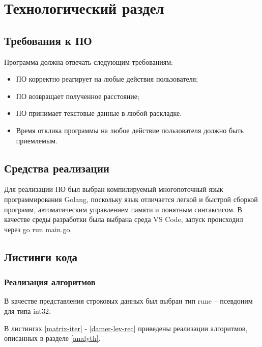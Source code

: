 \chapter{Технологический раздел}

\section{Требования к ПО}
Программа должна отвечать следующим требованиям:
\begin{itemize}
	\item ПО корректно реагирует на любые действия пользователя;
	\item ПО возвращает полученное расстояние;
	\item ПО принимает текстовые данные в любой раскладке.
	\item Время отклика программы на любое действие пользователя должно быть приемлемым.
\end{itemize}
\section{Средства реализации}
Для реализации ПО был выбран компилируемый многопоточный язык программирования Golang, поскольку язык отличается легкой и быстрой сборкой программ, автоматическим управлением памяти и понятным синтаксисом.
В качестве среды разработки была выбрана среда VS Code, запуск происходил через go run main.go.

\section{Листинги кода}
\subsection{Реализация алгоритмов}

В качестве представления строковых данных был выбран тип rune\cite{rune} -- псевдоним для типа int32. 

В листингах \ref{matrix-iter} - \ref{damer-lev-rec} приведены реализации алгоритмов, описанных в разделе \ref{analyth}.



